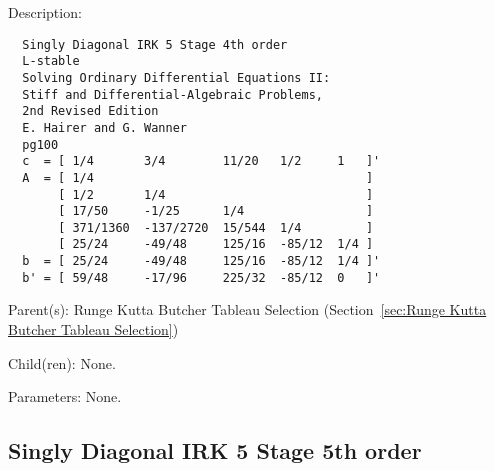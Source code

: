 \begin{list}{}
  {\setlength{\leftmargin}{1.0in}
   \setlength{\labelwidth}{0.75in}
   \setlength{\labelsep}{0.125in}}
  \item[Description:]
\begin{verbatim}
  Singly Diagonal IRK 5 Stage 4th order
  L-stable
  Solving Ordinary Differential Equations II:
  Stiff and Differential-Algebraic Problems,
  2nd Revised Edition
  E. Hairer and G. Wanner
  pg100
  c  = [ 1/4       3/4        11/20   1/2     1   ]'
  A  = [ 1/4                                      ]
       [ 1/2       1/4                            ]
       [ 17/50     -1/25      1/4                 ]
       [ 371/1360  -137/2720  15/544  1/4         ]
       [ 25/24     -49/48     125/16  -85/12  1/4 ]
  b  = [ 25/24     -49/48     125/16  -85/12  1/4 ]'
  b' = [ 59/48     -17/96     225/32  -85/12  0   ]'
\end{verbatim}
  \item[Parent(s):]
    Runge Kutta Butcher Tableau Selection (Section~\ref{sec:Runge Kutta Butcher Tableau Selection})
  \item[Child(ren):]
    None. 
  \item[Parameters:]
    None. 
\end{list}

\subsection{Singly Diagonal IRK 5 Stage 5th order}
\label{sec:Singly Diagonal IRK 5 Stage 5th order}

